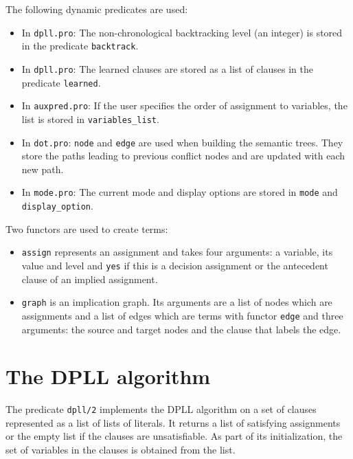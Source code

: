 \documentclass[11pt]{report}
\newcommand*{\p}[1]{\textup{\texttt{#1}}}
\begin{document}
The following dynamic predicates are used:
\begin{itemize}
\item In \p{dpll.pro}: The non-chronological backtracking level (an
 integer) is stored in the predicate \p{backtrack}.

\item In \p{dpll.pro}: The learned clauses are stored as a list of
clauses in the predicate \p{learned}.

\item In \p{auxpred.pro}: If the user specifies the order of assignment
to variables, the list is stored in \p{variables\_list}.

\item In \p{dot.pro}: \p{node} and \p{edge} are used when building the
semantic trees. They store the paths leading to previous conflict nodes
and are updated with each new path.

\item In \p{mode.pro}: The current mode and display options are stored
in \p{mode} and \p{display\_option}. 

\end{itemize}

Two functors are used to create terms:
\begin{itemize}

\item \p{assign} represents an assignment and takes four arguments: a
variable, its value and level and \p{yes} if this is a decision
assignment or the antecedent clause of an implied assignment.

\item \p{graph} is an implication graph. Its arguments are a list of
nodes which are assignments and a list of edges which are terms with
functor \p{edge} and three arguments: the source and target nodes
and the clause that labels the edge.
\end{itemize}


\section{The DPLL algorithm}

The predicate \p{dpll/2} implements the DPLL algorithm on a set of
clauses represented as a list of lists of literals. It returns a list of
satisfying assignments or the empty list if the clauses are
unsatisfiable. As part of its initialization, the set of variables in
the clauses is obtained from the list.
\end{document}
